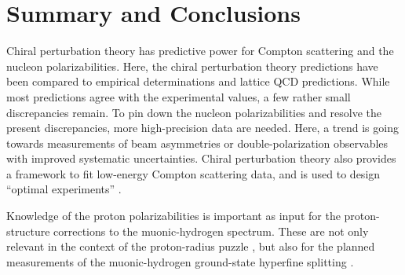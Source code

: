 \documentclass[preprints,review,accept,moreauthors,pdftex]{Definitions/mdpi}
\begin{document}
\section{Summary and Conclusions} \label{hydrogen}

Chiral perturbation theory has predictive power for Compton scattering and the nucleon polarizabilities. Here, the chiral perturbation theory predictions have been compared to empirical determinations and lattice QCD predictions.  While most predictions agree with the experimental values, a few rather small discrepancies remain. To pin down the nucleon polarizabilities and resolve the present discrepancies, more high-precision data are needed. Here, a trend is going towards measurements of beam asymmetries or double-polarization observables with improved systematic uncertainties.
Chiral perturbation theory also provides a framework to fit low-energy Compton scattering data, and is used to design ``optimal experiments'' \cite{Melendez:2020ikd}.

Knowledge of the proton polarizabilities is  important as input for the proton-structure corrections to the muonic-hydrogen spectrum. These are not only relevant in the context of the proton-radius puzzle \cite{Pohl:2010zza,Antognini:1900ns}, but also for the planned measurements of the muonic-hydrogen ground-state hyperfine splitting \cite{Pohl:2016xsr,Bakalov:2015xya,Kanda:2018oay}.



\vspace{6pt} 








\end{document}
